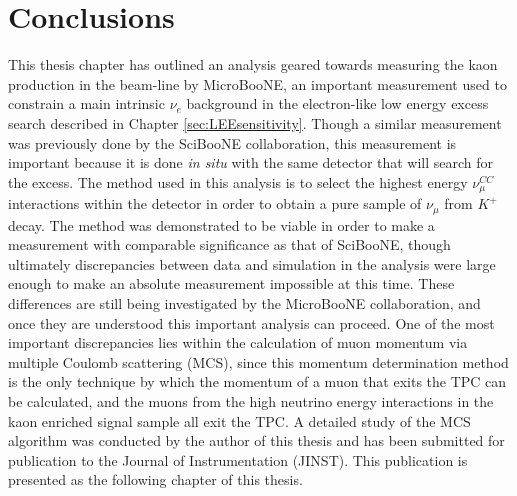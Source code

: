 \section{Conclusions}
This thesis chapter has outlined an analysis geared towards measuring the kaon production in the beam-line by MicroBooNE, an important measurement used to constrain a main intrinsic $\nu_e$ background in the electron-like low energy excess search described in Chapter \ref{sec:LEEsensitivity}. Though a similar measurement was previously done by the SciBooNE collaboration, this measurement is important because it is done \textit{in situ} with the same detector that will search for the excess. The method used in this analysis is to select the highest energy $\nu_\mu^{CC}$ interactions within the detector in order to obtain a pure sample of $\nu_\mu$ from $K^+$ decay. The method was demonstrated to be viable in order to make a measurement with comparable significance as that of SciBooNE, though ultimately discrepancies between data and simulation in the analysis were large enough to make an absolute measurement impossible at this time. These differences are still being investigated by the MicroBooNE collaboration, and once they are understood this important analysis can proceed. One of the most important discrepancies lies within the calculation of muon momentum via multiple Coulomb scattering (MCS), since this momentum determination method is the only technique by which the momentum of a muon that exits the TPC can be calculated, and the muons from the high neutrino energy interactions in the kaon enriched signal sample all exit the TPC. A detailed study of the MCS algorithm was conducted by the author of this thesis and has been submitted for publication to the Journal of Instrumentation (JINST). This publication is presented as the following chapter of this thesis.

